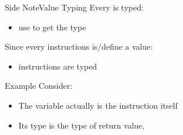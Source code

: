 \documentclass[10pt,mathserif]{beamer}
\begin{document}
\begin{frame}{Side Note}{Value Typing}
Every  is typed:

\begin{itemize}
\item use  to get the type
\end{itemize}

\vfill
Since every instructions is/define a value:

\begin{itemize}
\item instructions are typed
\end{itemize}

\vfill
\begin{block}{Example}
Consider:

\centering
{}

\flushleft
\begin{itemize}
\item The  variable actually is the instruction itself
\item Its type is the type of  return value, 
\end{itemize}
\end{block}
\end{frame}
\end{document}

